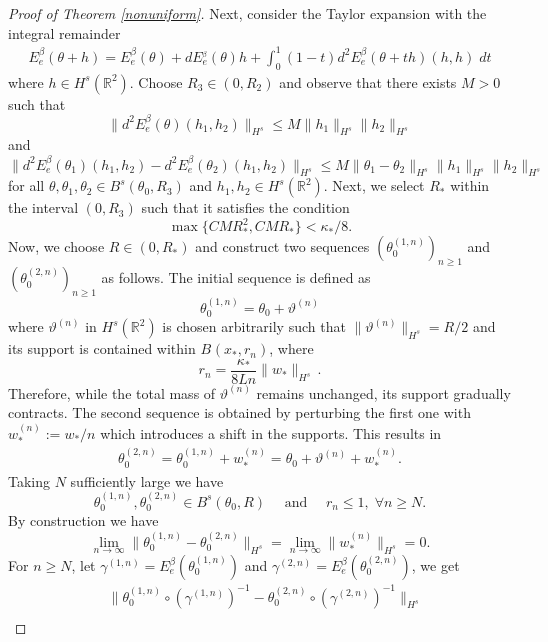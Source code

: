 \documentclass[11pt]{amsart}
\numberwithin{equation}{section}
\begin{document}
\begin{proof}[Proof of Theorem \ref{nonuniform}]
   Next, consider the Taylor expansion with the integral remainder
	\begin{align}
	E_e^{\beta}(\theta + h) = E_e^{\beta}(\theta) + d E_{e}^{_{\beta}} (\theta)h + \int_0^1 (1-t) d^2 E_e^{\beta}{(\theta + t h)}(h,h) \;dt
	\end{align}
    where $h\in H^s(\mathbb R^2)$.
Choose $ R_3 \in(0, R_2)$ and observe that there exists $M > 0$ such that
	\[
	\|d^2 E_e^{\beta}(\theta)(h_1,h_2)\|_{H^s} \leq M \|h_1\|_{H^s} \|h_2\|_{H^s}
	\]
	and
	\[
	\|d^2 E_e^{\beta}(\theta_1)(h_1,h_2)-d^2 E_e^{\beta}(\theta_2)(h_1,h_2)\|_{H^s} \leq M \|\theta_1-\theta_2\|_{H^s} \|h_1\|_{H^s} \|h_2\|_{H^s}
	\]
	for all $\theta, \theta_1, \theta_2 \in B_{}^s(\theta_0,R_3)$ and $h_1,h_2 \in H^s(\mathbb R^2)$. Next, we select $R_{*}$ within the interval  $ (0, R_3)$ such that it satisfies the condition
	\begin{equation}\label{condition}
		\max\{C M R_*^2,C M R_*\} < \kappa_{*}/8.
	\end{equation}
	Now, we choose $R\in(0, R_*)$ and construct two sequences $(\theta_0^{(1,n)})_{n \geq 1}$ and $( \theta_0^{(2,n)})_{n \geq 1}$ as follows.
The initial sequence is defined as
	\[
	\theta_0^{(1,n)}=\theta_0 + \vartheta^{(n)}
	\]
	where $\vartheta^{(n)}$ in $H^s(\mathbb R^2)$ is chosen arbitrarily such that $\|\vartheta^{(n)}\|_{H^s}={R}/{2}$ and its support is contained within $B_{}(x_*,r_n)$, where
	\[
	r_n=\frac{\kappa_*}{8Ln}\|w_*\|_{H^s}\,.
	\]
	Therefore, while the total mass of $\vartheta^{(n)}$ remains unchanged, its support gradually contracts. The second sequence is obtained by perturbing the first one with $w_*^{(n)}:=w_*/n$ which introduces a shift in the supports. This results in
	\begin{align}
	 \theta_0^{(2,n)} = \theta_0^{(1,n)} + w_*^{(n)}=\theta_0 + \vartheta^{(n)}+w_*^{(n)}.
	\end{align}
 Taking $N$ sufficiently large we have
	\[
	\theta_0^{(1,n)},\theta_0^{(2,n)} \in B^s(\theta_0,R)\quad \mbox{ and }\quad r_n \leq 1, \; \forall n \geq N.
	\]
	By construction we have
	\[
	\lim_{n \to \infty} \|\theta_0^{(1,n)}- \theta_0^{(2,n)}\|_{H^s} = \lim_{n \to \infty} \|w_*^{(n)}\|_{H^s} = 0.
	\]
	For $n \geq N$, let $\gamma^{(1,n)} =  E_{e}^{\beta}(\theta_0^{(1,n)})$ and $\gamma^{(2,n)} =  E_{e}^{\beta}( \theta_0^{(2,n)})$, we get
	\begin{align*}
        &\|\theta_0^{(1,n)} \circ (\gamma^{(1,n)})^{-1} - \theta_0^{(2,n)} \circ (\gamma^{(2,n)})^{-1}\|_{H^s} \\

\end{align*}
\end{proof}
\end{document}

